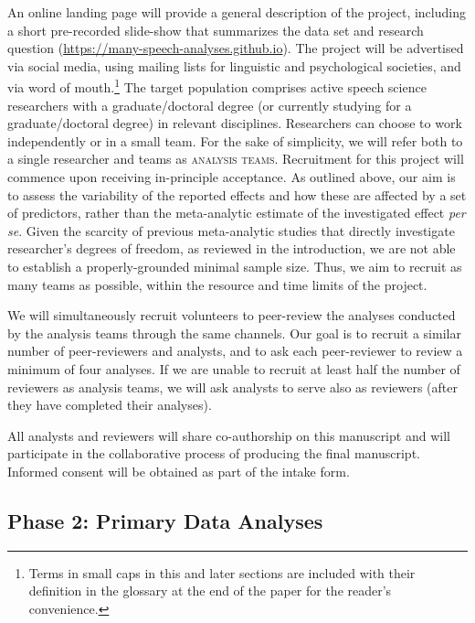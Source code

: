 \documentclass[Review,times,sageh]{sagej}
\begin{document}
An online landing page will provide a general description of the project, including a short pre-recorded slide-show that summarizes the data set and research question (\url{https://many-speech-analyses.github.io}).
The project will be advertised via social media, using mailing lists for linguistic and psychological societies, and via word of mouth.\footnote{Terms in small caps in this and later sections are included with their definition in the glossary at the end of the paper for the reader's convenience.}
The target population comprises active speech science researchers with a graduate/doctoral degree (or currently studying for a graduate/doctoral degree) in relevant disciplines.
Researchers can choose to work independently or in a small team.
For the sake of simplicity, we will refer both to a single researcher and teams as \textsc{analysis teams}.
Recruitment for this project will commence upon receiving in-principle acceptance.
As outlined above, our aim is to assess the variability of the reported effects and how these are affected by a set of predictors, rather than the meta-analytic estimate of the investigated effect \emph{per se}.
Given the scarcity of previous meta-analytic studies that directly investigate researcher's degrees of freedom, as reviewed in the introduction, we are not able to establish a properly-grounded minimal sample size.
Thus, we aim to recruit as many teams as possible, within the resource and time limits of the project.

We will simultaneously recruit volunteers to peer-review the analyses conducted by the analysis teams through the same channels.
Our goal is to recruit a similar number of peer-reviewers and analysts, and to ask each peer-reviewer to review a minimum of four analyses.
If we are unable to recruit at least half the number of reviewers as analysis teams, we will ask analysts to serve also as reviewers (after they have completed their analyses).

All analysts and reviewers will share co-authorship on this manuscript and will participate in the collaborative process of producing the final manuscript.
Informed consent will be obtained as part of the intake form.

\hypertarget{phase-2-primary-data-analyses}{%
\subsection{Phase 2: Primary Data Analyses}\label{phase-2-primary-data-analyses}}
\end{document}
